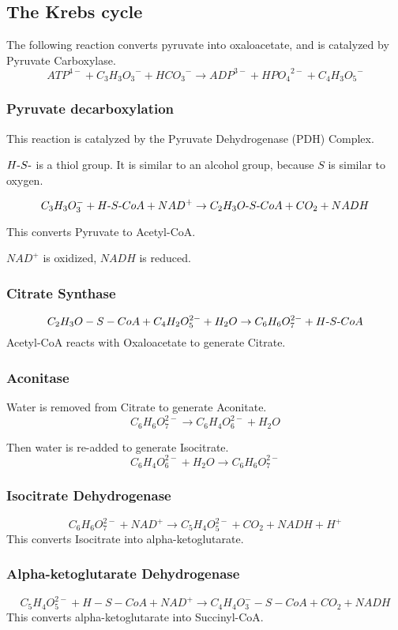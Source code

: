 \documentclass{article}
\def\mhyphen{{\hbox{-}}}
\begin{document}
\subsection{The Krebs cycle}
The following reaction converts pyruvate into oxaloacetate, and is catalyzed by Pyruvate
Carboxylase.
\[
    {ATP}^{4-} + {C_3H_3O_3}^- + {HCO_3}^- \rightarrow {ADP}^{3-} + {HPO_4}^{2-} + {C_4H_3O_5}^-
\]

\subsubsection{Pyruvate decarboxylation}
This reaction is catalyzed by the Pyruvate Dehydrogenase (PDH) Complex.

$H{\mhyphen}S{\mhyphen}$ is a thiol group. It is similar to an alcohol group, because $S$ is similar to
oxygen.

\[
    C_3H_3O_3^- + H{\mhyphen}S{\mhyphen}CoA + NAD^+ \rightarrow C_2H_3O{\mhyphen}S{\mhyphen}CoA + CO_2 + NADH
\]

This converts Pyruvate to Acetyl-CoA.

$NAD^+$ is oxidized, $NADH$ is reduced.

\subsubsection{Citrate Synthase}
\[
    C_2H_3O-S-CoA + C_4H_2O_5^{2-} + H_2O \rightarrow C_6H_6O_7^{2-} + H{\mhyphen}S{\mhyphen}CoA
\]
Acetyl-CoA reacts with Oxaloacetate to generate Citrate.

\subsubsection{Aconitase}
Water is removed from Citrate to generate Aconitate.
\[
    C_6H_6O_7^{2-} \rightarrow C_6H_4O_6^{2-} + H_2O
\]

Then water is re-added to generate Isocitrate.
\[
    C_6H_4O_6^{2-} + H_2O \rightarrow C_6H_6O_7^{2-}
\]

\subsubsection{Isocitrate Dehydrogenase}
\[
    C_6H_6O_7^{2-} + NAD^+ \rightarrow C_5H_4O_5^{2-} + CO_2 + NADH + H^+
\]
This converts Isocitrate into alpha-ketoglutarate.

\subsubsection{Alpha-ketoglutarate Dehydrogenase}
\[
    C_5H_4O_5^{2-} + H-S-CoA + NAD^+ \rightarrow C_4H_4O_3^{-}-S-CoA + CO_2 + NADH
\]
This converts alpha-ketoglutarate into Succinyl-CoA.
\end{document}
